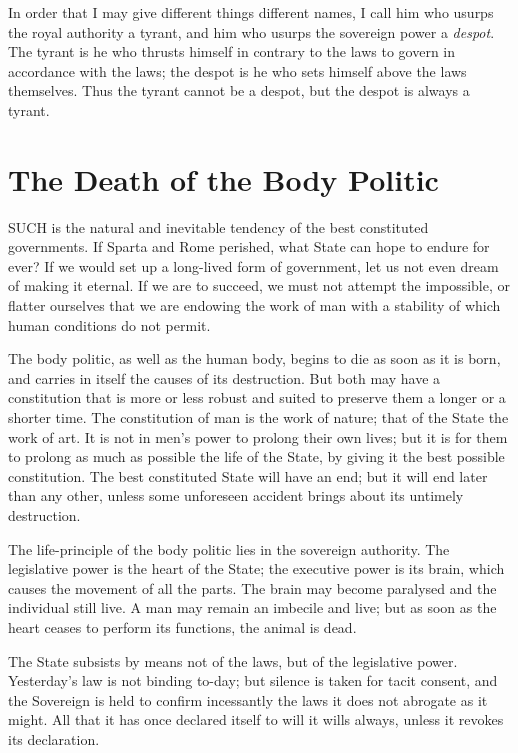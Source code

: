 \documentclass[12pt]{report}
\begin{document}
In order that I may give different things different names, I call him who usurps the royal authority a tyrant, and him who usurps the sovereign power a \textit{despot}. The tyrant is he who thrusts himself in contrary to the laws to govern in accordance with the laws; the despot is he who sets himself above the laws themselves. Thus the tyrant cannot be a despot, but the despot is always a tyrant.

\section{The Death of the Body Politic}
SUCH is the natural and inevitable tendency of the best constituted governments. If Sparta and Rome perished, what State can hope to endure for ever? If we would set up a long-lived form of government, let us not even dream of making it eternal. If we are to succeed, we must not attempt the impossible, or flatter ourselves that we are endowing the work of man with a stability of which human conditions do not permit.

The body politic, as well as the human body, begins to die as soon as it is born, and carries in itself the causes of its destruction. But both may have a constitution that is more or less robust and suited to preserve them a longer or a shorter time. The constitution of man is the work of nature; that of the State the work of art. It is not in men's power to prolong their own lives; but it is for them to prolong as much as possible the life of the State, by giving it the best possible constitution. The best constituted State will have an end; but it will end later than any other, unless some unforeseen accident brings about its untimely destruction.

The life-principle of the body politic lies in the sovereign authority. The legislative power is the heart of the State; the executive power is its brain, which causes the movement of all the parts. The brain may become paralysed and the individual still live. A man may remain an imbecile and live; but as soon as the heart ceases to perform its functions, the animal is dead.

The State subsists by means not of the laws, but of the legislative power. Yesterday's law is not binding to-day; but silence is taken for tacit consent, and the Sovereign is held to confirm incessantly the laws it does not abrogate as it might. All that it has once declared itself to will it wills always, unless it revokes its declaration.
\end{document}
